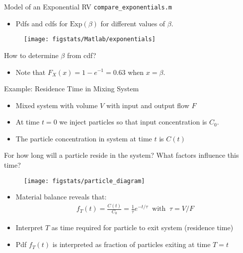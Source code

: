 \documentclass[handout,9pt]{beamer}
\begin{document}
%
\begin{frame}{Model of an Exponential RV \footnotesize{\texttt{compare\_exponentials.m}}}
\begin{itemize}
\item Pdfs and cdfs for $\textrm{Exp}(\beta)$ for different values of $\beta$.
\end{itemize}
\begin{figure}[!htb]
    \centering
	\texttt{[image: figstats/Matlab/exponentials]}
\end{figure}
\begin{block}{}
\begin{center}
How to determine $\beta$ from cdf? 
\end{center}
\end{block}
\pause
\begin{itemize}
\item Note that $F_X(x)=1-e^{-1}=0.63$ when $x=\beta$. 
\end{itemize}
\end{frame}

%
\begin{frame}{Example: Residence Time in Mixing System}
\begin{itemize}
\setlength{\itemsep}{10pt}
\item  Mixed system with volume $V$ with input and output flow $F$
\item At time $t=0$ we inject particles so that input concentration is $C_0$.
\item The particle concentration in system at time $t$ is $C(t)$
\end{itemize}
\begin{block}{}
For how long will a particle reside in the system?  What factors influence this time? 
\end{block}
\begin{figure}[!htb]
    \centering
	\texttt{[image: figstats/particle\_diagram]}
\end{figure}
\pause
\begin{itemize}
\item Material balance reveals that:
\begin{align*}
f_T(t)=\frac{C(t)}{C_0}= \frac{1}{\tau}e^{-t/\tau}\;\; \textrm{with}\;\; \tau=V/F
\end{align*}
\item Interpret $T$ as time required for particle to exit system (residence time)
\item Pdf $f_T(t)$ is interpreted as fraction of particles exiting at time $T=t$
\end{itemize}
\end{frame}
\end{document}
